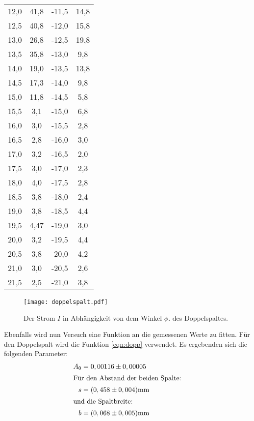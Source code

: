 \begin{table}
\begin{tabular}{c c c c}
    12,0 & 41,8  & -11,5 & 14,8 \\
    12,5 & 40,8  & -12,0 & 15,8 \\
    13,0 & 26,8  & -12,5 & 19,8 \\
    13,5 & 35,8  & -13,0 & 9,8 \\
    14,0 & 19,0  & -13,5 & 13,8 \\
    14,5 & 17,3  & -14,0 & 9,8  \\
    15,0 & 11,8  & -14,5 & 5,8  \\
    15,5 & 3,1   & -15,0 & 6,8  \\
    16,0 & 3,0   & -15,5 & 2,8  \\
    16,5 & 2,8   & -16,0 & 3,0  \\
    17,0 & 3,2   & -16,5 & 2,0  \\
    17,5 & 3,0   & -17,0 & 2,3  \\
    18,0 & 4,0   & -17,5 & 2,8  \\
    18,5 & 3,8   & -18,0 & 2,4  \\
    19,0 & 3,8   & -18,5 & 4,4  \\
    19,5 & 4,47  & -19,0 & 3,0  \\
    20,0 & 3,2   & -19,5 & 4,4  \\
    20,5 & 3,8   & -20,0 & 4,2  \\
    21,0 & 3,0   & -20,5 & 2,6  \\
    21,5 & 2,5   & -21,0 & 3,8  \\
    \bottomrule
    \end{tabular}
\end{table}
\FloatBarrier
\begin{figure}
  \centering
  \texttt{[image: doppelspalt.pdf]}
  \caption{ Der Strom $I$ in Abhängigkeit von dem Winkel $\phi$. des Doppelspaltes.}
  \label{fig:dopp}
\end{figure}
\FloatBarrier
Ebenfalls wird nun Versuch eine Funktion an die gemessenen Werte zu fitten.
Für den Doppelspalt wird die Funktion \eqref{eqn:dopp} verwendet.
Es ergebenden sich die folgenden
Parameter:
\begin{align*}
  A_0&=0,00116\pm0,00005\\
  \intertext{Für den Abstand der beiden Spalte:} \  s&=(0,458\pm0,004)\si{\milli\meter}\\
  \intertext{und die Spaltbreite:} \  b&=(0,068\pm0,005)\si{\milli\meter}\\
\end{align*}
